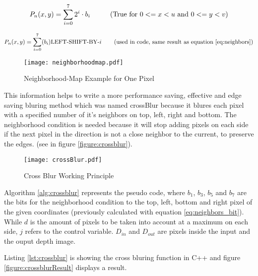 \begin{equation}
	P_n(x,y)=\sum_{i=0}^7 2^i \cdot b_i \mbox{\hspace{1cm}(True for $0<=x<u$ and $0<=y<v$)}
\label{eq:neighbors} 
\end{equation}

\begin{equation}
	P_n(x,y)=\sum_{i=0}^7 (b_i)\mbox{LEFT-SHIFT-BY-$i$ \hspace{0.5cm} (used in code, same result as equation \ref{eq:neighbors})}
\label{eq:neighbors_cpp} 
\end{equation}
 
 

\begin{figure}[H]
\begin{center}
  \texttt{[image: neighborhoodmap.pdf]}
  \caption{Neighborhood-Map Example for One Pixel}
  \label{figure:neighborhoodmap}
\end{center}
\end{figure}

This information helps to write a more performance saving, effective and edge saving bluring method which 
was named crossBlur because it blures each pixel with a specified number of it's neighbors on top, left, right and bottom.
The neighborhood condition is needed because it will stop adding pixels on each side if the next pixel in the direction 
is not a close neighbor to the current, to preserve the edges. (see in figure \vref{figure:crossblur}).

\begin{figure}[H]
\begin{center}
  \texttt{[image: crossBlur.pdf]}
  \caption{Cross Blur Working Principle}
  \label{figure:crossblur}
\end{center}
\end{figure} 



Algorithm \vref{alg:crossblur} represents the pseudo code, where $b_1$, $b_3$, $b_5$
and $b_7$ are the bits for the neighborhood condition to the top, left, bottom and right pixel
of the given coordinates (previously calculated with equation \vref{eq:neighbors_bit}). While
$d$ is the amount of pixels to be taken into account at a maximum on each side, $j$ refers to the control
variable.  $D_{in}$ and $D_{out}$ are pixels inside the input and the ouput depth image.

Listing \vref{lst:crossblur} is showing the cross bluring function in C++ and figure \vref{figure:crossblurResult} 
displays a result.


